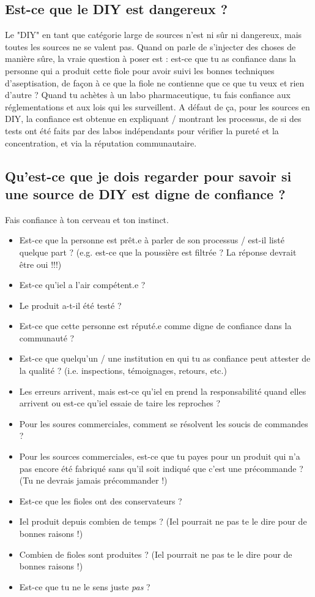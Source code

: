 \documentclass{article}
\begin{document}
\subsection{Est-ce que le DIY est dangereux ?}

Le "DIY" en tant que catégorie large de sources n'est ni sûr ni dangereux, mais toutes les sources ne se valent pas. Quand on parle de s'injecter des choses de manière sûre, la vraie question à poser est : est-ce que tu as confiance dans la personne qui a produit cette fiole pour avoir suivi les bonnes techniques d'aseptisation, de façon à ce que la fiole ne contienne que ce que tu veux et rien d'autre ? Quand tu achètes à un labo pharmaceutique, tu fais confiance aux réglementations et aux lois qui les surveillent. A défaut de ça, pour les sources en DIY, la confiance est obtenue en expliquant / montrant les processus, de si des tests ont été faits par des labos indépendants pour vérifier la pureté et la concentration, et via la réputation communautaire.

\subsection{Qu'est-ce que je dois regarder pour savoir si une source de DIY est digne de confiance ?}

Fais confiance à ton cerveau et ton instinct.

\begin{itemize}
  \item Est-ce que la personne est prêt.e à parler de son processus / est-il listé quelque part ? (e.g. est-ce que la poussière est filtrée ? La réponse devrait être oui !!!)
  \item Est-ce qu'iel a l'air compétent.e ?
  \item Le produit a-t-il été testé ?
  \item Est-ce que cette personne est réputé.e comme digne de confiance dans la communauté ?
  \item Est-ce que quelqu'un / une institution en qui tu as confiance peut attester de la qualité ? (i.e. inspections, témoignages, retours, etc.)
  \item Les erreurs arrivent, mais est-ce qu'iel en prend la responsabilité quand elles arrivent ou est-ce qu'iel essaie de taire les reproches ?
  \item Pour les soures commerciales, comment se résolvent les soucis de commandes ?
  \item Pour les sources commerciales, est-ce que tu payes pour un produit qui n'a pas encore été fabriqué sans qu'il soit indiqué que c'est une précommande ? (Tu ne devrais jamais précommander !)
  \item Est-ce que les fioles ont des conservateurs ?
  \item Iel produit depuis combien de temps ? (Iel pourrait ne pas te le dire pour de bonnes raisons !)
  \item Combien de fioles sont produites ? (Iel pourrait ne pas te le dire pour de bonnes raisons !)
  \item Est-ce que tu ne le sens juste \textit{pas} ?
\end{itemize}
\end{document}
